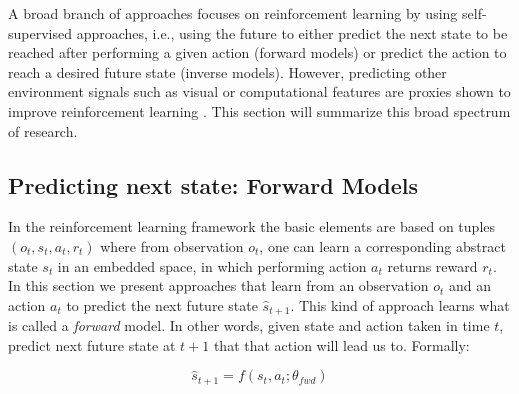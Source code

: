 \documentclass[a4paper]{article}
\begin{document}
A broad branch of approaches focuses on reinforcement learning by using self-supervised approaches, i.e., using the future to either predict the next state to be reached after performing a given action (forward models) or predict the action to reach a desired future state (inverse models). However, predicting other environment signals such as visual or computational features are proxies shown to improve reinforcement learning \cite{Jaderberg16}. This section will summarize this broad spectrum of research.


\subsection{Predicting next state: Forward Models }
\label{subsec:forward}
In the reinforcement learning framework the basic elements are based on tuples $(o_t, s_t, a_t, r_t)$ where from observation $o_t$, one can learn a corresponding abstract state $s_t$ in an embedded space, in which performing action $a_t$ returns reward $r_t$.
In this section we present approaches that learn from an observation $o_t$ and an action $a_t$ to predict the next future state $\hat{s}_{t+1}$. This kind of approach learns what is called a \textit{forward} model. In other words, given state and action taken in time $t$, predict next future state at $t+1$ that that action will lead us to. Formally: 

\begin{equation}  
\hat{s}_{t+1} = f(s_t, a_t; \theta_{fwd})
\label{fwd}
\end{equation}
\end{document}

